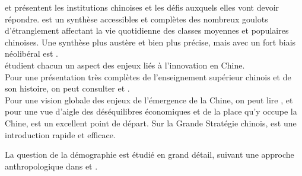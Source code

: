 \documentclass[a4paper]{article}
\begin{document}
\cite{heilmann17_chinas,dickson16} et \cite{cabestan18_demain_chine} présentent les
institutions chinoises et les défis auxquels elles vont devoir répondre.
\cite{damien14_in} est un synthèse accessibles et complètes des nombreux goulots
d’étranglement affectant la vie quotidienne des classes moyennes et populaires
chinoises. Une synthèse plus austère et bien plus précise, mais avec un fort
biais néolibéral est \cite{dollar20_china}.\\

\cite{xiaolan15_chinas,haour16_creat_china,hong17_networ_china} étudient chacun un
aspect des enjeux liés à l’innovation en Chine.\\

Pour une présentation très complètes de l’enseignement supérieur chinois et de
son histoire, on peut consulter \cite{andreas09_rise} et \cite{simon09_chinas}.\\

Pour une vision globale des enjeux de l’émergence de la Chine, on peut lire
\cite{shambaugh13_china}, et pour une vue d’aigle des déséquilibres économiques et
de la place qu’y occupe la Chine, \cite{klein20_trade} est un excellent point de
départ. Sur la Grande Stratégie chinois, \cite{khan18_haunt} est une introduction
rapide et efficace.

La question de la démographie est étudié en grand détail, suivant une approche
 anthropologique dans \cite{greenhalgh08_just,greenhalgh05_gover_chinas} et
 \cite{greenhalgh10_cultiv}.


\end{document}
